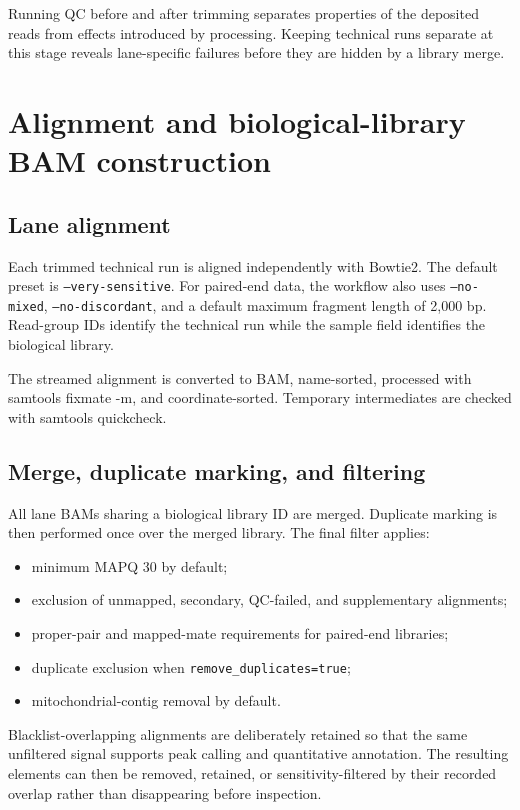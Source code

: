 \documentclass[11pt]{article}
\newcommand{\software}[1]{\textsf{#1}}
\begin{document}
Running QC before and after trimming separates properties of the deposited
reads from effects introduced by processing.  Keeping technical runs separate
at this stage reveals lane-specific failures before they are hidden by a
library merge.

\section{Alignment and biological-library BAM construction}

\subsection{Lane alignment}

Each trimmed technical run is aligned independently with \software{Bowtie2}.
The default preset is \texttt{--very-sensitive}.  For paired-end data, the
workflow also uses \texttt{--no-mixed}, \texttt{--no-discordant}, and a default
maximum fragment length of 2,000 bp.  Read-group IDs identify the technical
run while the sample field identifies the biological library.

The streamed alignment is converted to BAM, name-sorted, processed with
\software{samtools fixmate -m}, and coordinate-sorted.  Temporary intermediates
are checked with \software{samtools quickcheck}.

\subsection{Merge, duplicate marking, and filtering}

All lane BAMs sharing a biological library ID are merged.  Duplicate marking
is then performed once over the merged library.  The final filter applies:

\begin{itemize}
  \item minimum MAPQ 30 by default;
  \item exclusion of unmapped, secondary, QC-failed, and supplementary
  alignments;
  \item proper-pair and mapped-mate requirements for paired-end libraries;
  \item duplicate exclusion when \texttt{remove\_duplicates=true};
  \item mitochondrial-contig removal by default.
\end{itemize}

Blacklist-overlapping alignments are deliberately retained so that the same
unfiltered signal supports peak calling and quantitative annotation.  The
resulting elements can then be removed, retained, or sensitivity-filtered by
their recorded overlap rather than disappearing before inspection.
\end{document}
